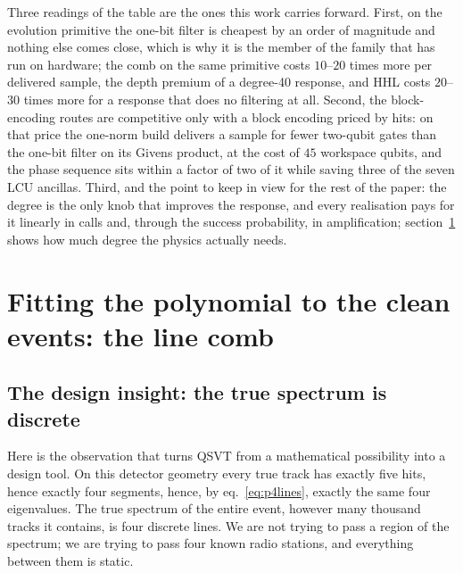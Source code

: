 \documentclass[11pt,a4paper]{article}
\begin{document}
Three readings of the table are the ones this work carries forward.
First, on the evolution primitive the one-bit filter is cheapest by an
order of magnitude and nothing else comes close, which is why it is the
member of the family that has run on hardware; the comb on the same
primitive costs $10$--$20$ times more per delivered sample, the depth
premium of a degree-40 response, and HHL costs $20$--$30$ times more for a
response that does no filtering at all. Second, the block-encoding routes
are competitive only with a block encoding priced by hits: on that price
the one-norm build delivers a sample for fewer two-qubit gates than the
one-bit filter on its Givens product, at the cost of $45$ workspace qubits,
and the phase sequence sits within a factor of two of it while saving three
of the seven LCU ancillas. Third, and the point to keep in view for the
rest of the paper: the degree is the only knob that improves the response,
and every realisation pays for it linearly in calls and, through the
success probability, in amplification; section~\ref{sec:comb} shows how
much degree the physics actually needs.

\section{Fitting the polynomial to the clean events: the line comb}
\label{sec:comb}

\subsection{The design insight: the true spectrum is discrete}

Here is the observation that turns QSVT from a mathematical
possibility into a design tool. On this detector geometry every true
track has exactly five hits, hence exactly four segments, hence, by
eq.~\eqref{eq:p4lines}, exactly the same four eigenvalues. The true
spectrum of the entire event, however many thousand tracks it
contains, is four discrete lines. We are not trying to pass a region
of the spectrum; we are trying to pass four known radio stations, and
everything between them is static.
\end{document}
